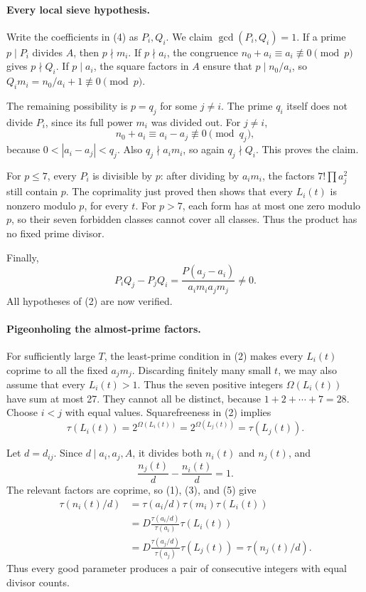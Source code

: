 \paragraph{Every local sieve hypothesis.}
Write the coefficients in (4) as \(P_i,Q_i\). We claim \(\gcd(P_i,Q_i)=1\). If a prime \(p\mid P_i\) divides \(A\), then \(p\nmid m_i\). If \(p\nmid a_i\), the congruence \(n_0+a_i\equiv a_i\not\equiv0\pmod p\) gives \(p\nmid Q_i\). If \(p\mid a_i\), the square factors in \(A\) ensure that \(p\mid n_0/a_i\), so \(Q_i m_i=n_0/a_i+1\not\equiv0\pmod p\).

The remaining possibility is \(p=q_j\) for some \(j\ne i\). The prime \(q_i\) itself does not divide \(P_i\), since its full power \(m_i\) was divided out. For \(j\ne i\),
\[
 n_0+a_i\equiv a_i-a_j\not\equiv0\pmod{q_j},
\]
because \(0<|a_i-a_j|<q_j\). Also \(q_j\nmid a_i m_i\), so again \(q_j\nmid Q_i\). This proves the claim.

For \(p\leq7\), every \(P_i\) is divisible by \(p\): after dividing by \(a_i m_i\), the factors \(7!\prod a_j^2\) still contain \(p\). The coprimality just proved then shows that every \(L_i(t)\) is nonzero modulo \(p\), for every \(t\). For \(p>7\), each form has at most one zero modulo \(p\), so their seven forbidden classes cannot cover all classes. Thus the product has no fixed prime divisor.

Finally,
\[
 P_iQ_j-P_jQ_i
 =\frac{P(a_j-a_i)}{a_i m_i a_j m_j}\ne0.
\]
All hypotheses of (2) are now verified.

\paragraph{Pigeonholing the almost-prime factors.}
For sufficiently large \(T\), the least-prime condition in (2) makes every \(L_i(t)\) coprime to all the fixed \(a_jm_j\). Discarding finitely many small \(t\), we may also assume that every \(L_i(t)>1\). Thus the seven positive integers \(\Omega(L_i(t))\) have sum at most 27. They cannot all be distinct, because \(1+2+\cdots+7=28\). Choose \(i<j\) with equal values. Squarefreeness in (2) implies
\[
 \tau(L_i(t))=2^{\Omega(L_i(t))}
             =2^{\Omega(L_j(t))}=\tau(L_j(t)). \tag{5}
\]

Let \(d=d_{ij}\). Since \(d\mid a_i,a_j,A\), it divides both \(n_i(t)\) and \(n_j(t)\), and
\[
 \frac{n_j(t)}d-\frac{n_i(t)}d=1.
\]
The relevant factors are coprime, so (1), (3), and (5) give
\[
 \begin{aligned}
 \tau(n_i(t)/d)
 &=\tau(a_i/d)\tau(m_i)\tau(L_i(t))\\
 &=D\frac{\tau(a_i/d)}{\tau(a_i)}\tau(L_i(t))\\
 &=D\frac{\tau(a_j/d)}{\tau(a_j)}\tau(L_j(t))
 =\tau(n_j(t)/d).
 \end{aligned}
\]
Thus every good parameter produces a pair of consecutive integers with equal divisor counts.

